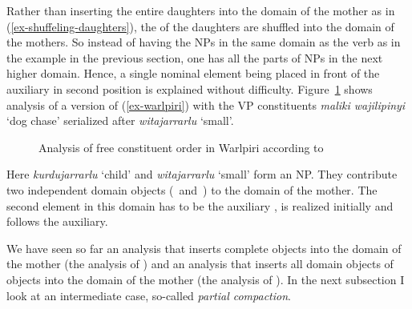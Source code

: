 \documentclass[output=paper,biblatex,babelshorthands,newtxmath,draftmode,colorlinks,citecolor=brown]{langscibook}
\begin{document}
\z
Rather than inserting the entire daughters into the domain of the mother as in
(\ref{ex-shuffeling-daughters}), the \domvs of the daughters are shuffled into the domain of the
mothers. So instead of having the NPs in the same domain as the verb as in the  example in the
previous section, one has all the parts of NPs in the next higher domain. Hence, a single nominal element
being placed in front of the auxiliary in second position is explained without
difficulty. Figure~\ref{fig-warlpiri} shows  analysis of a version of
(\ref{ex-warlpiri}) with the VP constituents \emph{maliki wajilipinyi} `dog chase' serialized after \emph{witajarrarlu} `small'.
\begin{figure}
\caption{\label{fig-warlpiri}Analysis of free constituent order in Warlpiri according to
  \citet[]{DS99a}}
\end{figure}
Here \emph{kurdujarrarlu} `child' and \emph{witajarrarlu} `small' form an NP. They contribute two independent domain objects (\,
and \,) to the domain of the mother. The second element in this domain has to be the auxiliary
,  is realized initially and  follows the auxiliary.

We have seen so far an analysis that inserts complete objects into the domain of the mother (the
analysis of ) and an analysis that inserts all domain objects of objects into the domain of the
mother (the analysis of ). In the next subsection I look at an intermediate case,
so-called \emph{partial compaction}.
\end{document}
